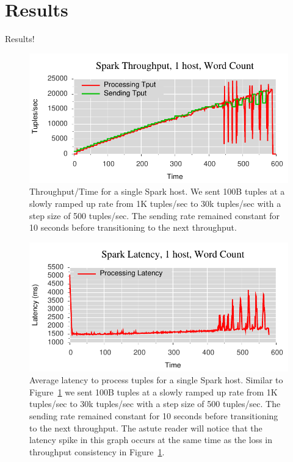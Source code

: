 \section{Results}
Results!

\begin{figure}[t]
\centering
\includegraphics[width=1\linewidth]{figures/sp1_tput.pdf}
\caption{Throughput/Time for a single Spark host. We sent 100B tuples at a
slowly ramped up rate from 1K tuples/sec to 30k tuples/sec with a step size of
500 tuples/sec. The sending rate remained constant for 10 seconds before
transitioning to the next throughput.}
\label{fig:sb1-tput}
\end{figure}

\begin{figure}[t]
\centering
\includegraphics[width=1\linewidth]{figures/sp1_latency.pdf}
\caption{Average latency to process tuples for a single Spark host. Similar to
Figure~\ref{fig:sb1-tput} we sent 100B tuples at a slowly ramped up rate from 1K
tuples/sec to 30k tuples/sec with a step size of 500 tuples/sec. The sending
rate remained constant for 10 seconds before transitioning to the next
throughput. The astute reader will notice that the latency spike in this graph
occurs at the same time as the loss in throughput consistency in
Figure~\ref{fig:sb1-tput}.}
\label{fig:label-me-if-you-want}
\end{figure}

